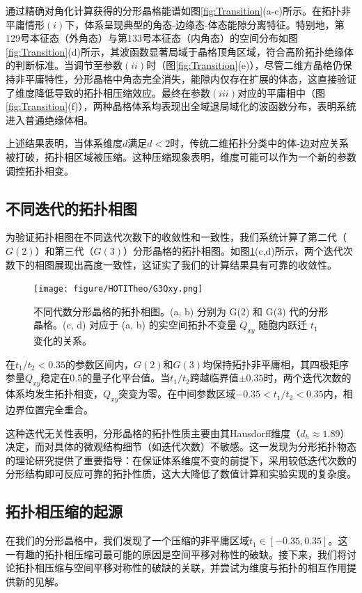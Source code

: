 通过精确对角化计算获得的分形晶格能谱如图\ref{fig:Transition}(a-c)所示。在拓扑非平庸情形$(i)$下，体系呈现典型的角态-边缘态-体态能隙分离特征。特别地，第129号本征态（外角态）与第133号本征态（内角态）的空间分布如图\ref{fig:Transition}(d)所示，其波函数显著局域于晶格顶角区域，符合高阶拓扑绝缘体的判断标准。当调节至参数$(ii)$时（图\ref{fig:Transition}(e)），尽管二维方晶格仍保持非平庸特性，分形晶格中角态完全消失，能隙内仅存在扩展的体态，这直接验证了维度降低导致的拓扑相压缩效应。最终在参数$(iii)$对应的平庸相中（图\ref{fig:Transition}(f)），两种晶格体系均表现出全域退局域化的波函数分布，表明系统进入普通绝缘体相。

上述结果表明，当体系维度$d$满足$d < 2$时，传统二维拓扑分类中的体-边对应关系被打破，拓扑相区域被压缩。这种压缩现象表明，维度可能可以作为一个新的参数调控拓扑相变。

\subsection{不同迭代的拓扑相图}

为验证拓扑相图在不同迭代次数下的收敛性和一致性，我们系统计算了第二代（$G(2)$）和第三代（$G(3)$）分形晶格的拓扑相图。如图\ref{fig:G3Qxy}(c,d)所示，两个迭代次数下的相图展现出高度一致性，这证实了我们的计算结果具有可靠的收敛性。

\begin{figure}[htbp]
    \centering
    \texttt{[image: figure/HOTITheo/G3Qxy.png]}
    \caption{不同代数分形晶格的拓扑相图。(a, b) 分别为 G(2) 和 G(3) 代的分形晶格。(c, d) 对应于 (a, b) 的实空间拓扑不变量 \( Q_{xy} \) 随胞内跃迁 \( t_1 \) 变化的关系。}
    \label{fig:G3Qxy}
\end{figure}

在$t_1/t_2 < 0.35$的参数区间内，$G(2)$和$G(3)$均保持拓扑非平庸相，其四极矩序参量$Q_{xy}$稳定在0.5的量子化平台值。当$t_1/t_2$跨越临界值$\pm 0.35$时，两个迭代次数的体系均发生拓扑相变，$Q_{xy}$突变为零。在中间参数区域$-0.35 < t_1/t_2 < 0.35$内，相边界位置完全重合。

这种迭代无关性表明，分形晶格的拓扑性质主要由其Hausdorff维度（$d_h \approx 1.89$）决定，而对具体的微观结构细节（如迭代次数）不敏感。这一发现为分形拓扑物态的理论研究提供了重要指导：在保证体系维度不变的前提下，采用较低迭代次数的分形结构即可反应可靠的拓扑性质，这大大降低了数值计算和实验实现的复杂度。

\subsection{拓扑相压缩的起源}
在我们的分形晶格中，我们发现了一个压缩的非平庸区域$t_1\in[-0.35,0.35]$。这一有趣的拓扑相压缩可最可能的原因是空间平移对称性的破缺。接下来，我们将讨论拓扑相压缩与空间平移对称性的破缺的关联，并尝试为维度与拓扑的相互作用提供新的见解。

